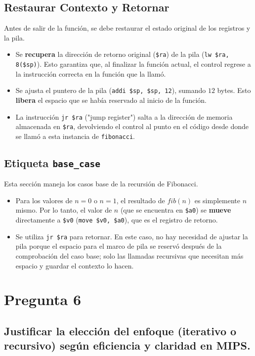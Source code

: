 \documentclass{article}
\begin{document}
\subsection*{Restaurar Contexto y Retornar}
Antes de salir de la función, se debe restaurar el estado original de los registros y la pila.
\begin{itemize}
    \item Se \textbf{recupera} la dirección de retorno original (\texttt{\$ra}) de la pila (\texttt{lw \$ra, 8(\$sp)}). Esto garantiza que, al finalizar la función actual, el control regrese a la instrucción correcta en la función que la llamó.
    \item Se ajusta el puntero de la pila (\texttt{addi \$sp, \$sp, 12}), sumando $12$ bytes. Esto \textbf{libera} el espacio que se había reservado al inicio de la función.
    \item La instrucción \texttt{jr \$ra} ("jump register") salta a la dirección de memoria almacenada en \texttt{\$ra}, devolviendo el control al punto en el código desde donde se llamó a esta instancia de \texttt{fibonacci}.
\end{itemize}

\subsection*{Etiqueta \texttt{base\_case}}
Esta sección maneja los casos base de la recursión de Fibonacci.
\begin{itemize}
    \item Para los valores de $n=0$ o $n=1$, el resultado de $fib(n)$ es simplemente $n$ mismo. Por lo tanto, el valor de $n$ (que se encuentra en \texttt{\$a0}) se \textbf{mueve} directamente a \texttt{\$v0} (\texttt{move \$v0, \$a0}), que es el registro de retorno.
    \item Se utiliza \texttt{jr \$ra} para retornar. En este caso, no hay necesidad de ajustar la pila porque el espacio para el marco de pila se reservó después de la comprobación del caso base; solo las llamadas recursivas que necesitan más espacio y guardar el contexto lo hacen.
\end{itemize}

\section*{Pregunta 6}

\subsection*{Justificar la elección del enfoque (iterativo o recursivo) según eficiencia y claridad en MIPS.}
\end{document}

